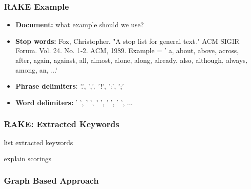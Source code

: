 \documentclass{beamer}
\begin{document}
\begin{frame}
\frametitle{RAKE Example}
\begin{itemize}
\item \textbf{Document:} \color{red} what example should we use? \color{black}
\vspace{0.3cm}
\item \textbf{Stop words:} Fox, Christopher. "A stop list for general text." ACM SIGIR Forum. Vol. 24. No. 1-2. ACM, 1989.
\vspace{0.3cm}
Example = ' a, about, above, across, after, again, against, all, almost, alone, along, already, also, although, always, among, an, ...'
\item \textbf{Phrase delimiters:} '.', ',', '!', ':', ';'
\vspace{0.3cm}
\item \textbf{Word delimiters:} ' ', '  ', '   ', '    ', '     ', ...
\end{itemize}
\end{frame}

\begin{frame}
\frametitle{RAKE: Extracted Keywords}

list extracted keywords

explain scorings
\end{frame}

\begin{frame}
\frametitle{Graph Based Approach}
\end{frame}
\end{document}
